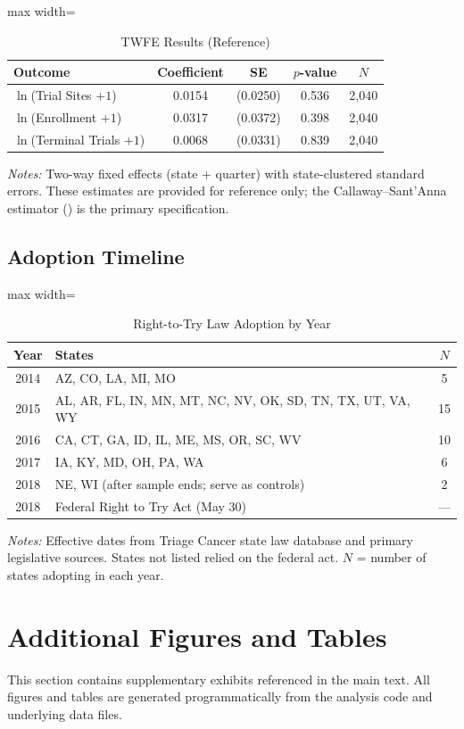 \documentclass[12pt]{article}
\begin{document}
\begin{table}[H]
\centering
\caption{TWFE Results (Reference)}
\label{tab:twfe_appendix}
\begin{adjustbox}{max width=\textwidth}
\begin{tabular}{lcccc}
\toprule
Outcome & Coefficient & SE & $p$-value & $N$ \\
\midrule
$\ln$(Trial Sites $+1$) & 0.0154 & (0.0250) & 0.536 & 2,040 \\
$\ln$(Enrollment $+1$) & 0.0317 & (0.0372) & 0.398 & 2,040 \\
$\ln$(Terminal Trials $+1$) & 0.0068 & (0.0331) & 0.839 & 2,040 \\
\bottomrule
\end{tabular}
\end{adjustbox}
\begin{minipage}{0.95\textwidth}
\vspace{0.3em}
\footnotesize \textit{Notes:} Two-way fixed effects (state + quarter) with state-clustered standard errors. These estimates are provided for reference only; the Callaway--Sant'Anna estimator () is the primary specification.
\end{minipage}
\end{table}

\subsection{Adoption Timeline}

\begin{table}[H]
\centering
\caption{Right-to-Try Law Adoption by Year}
\label{tab:timeline}
\begin{adjustbox}{max width=\textwidth}
\begin{tabular}{clc}
\toprule
Year & States & $N$ \\
\midrule
2014 & AZ, CO, LA, MI, MO & 5 \\
2015 & AL, AR, FL, IN, MN, MT, NC, NV, OK, SD, TN, TX, UT, VA, WY & 15 \\
2016 & CA, CT, GA, ID, IL, ME, MS, OR, SC, WV & 10 \\
2017 & IA, KY, MD, OH, PA, WA & 6 \\
2018 & NE, WI (after sample ends; serve as controls) & 2 \\
\midrule
2018 & Federal Right to Try Act (May 30) & --- \\
\bottomrule
\end{tabular}
\end{adjustbox}
\begin{minipage}{0.95\textwidth}
\vspace{0.3em}
\footnotesize \textit{Notes:} Effective dates from Triage Cancer state law database and primary legislative sources. States not listed relied on the federal act. $N$ = number of states adopting in each year.
\end{minipage}
\end{table}


\section{Additional Figures and Tables}\label{app:additional}

This section contains supplementary exhibits referenced in the main text. All figures and tables are generated programmatically from the analysis code and underlying data files.
\end{document}
